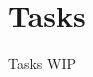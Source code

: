 \documentclass[../../UsabilityReport.tex]{subfiles}
\begin{document}
\section{Tasks}
	Tasks WIP
\end{document}
